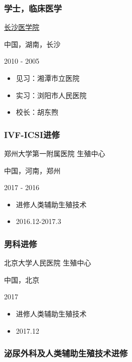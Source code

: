 \documentclass[]{article}
\providecommand{\tightlist}{%
  \setlength{\itemsep}{0pt}\setlength{\parskip}{0pt}}
\begin{document}
\hypertarget{ux5b66ux58ebux4e34ux5e8aux533bux5b66}{%
\subsubsection{学士，临床医学}\label{ux5b66ux58ebux4e34ux5e8aux533bux5b66}}

\href{http://www.csmu.edu.cn}{长沙医学院}

中国，湖南，长沙

2010 - 2005

\begin{itemize}
\tightlist
\item
  见习：湘潭市立医院
\item
  实习：浏阳市人民医院
\item
  校长：胡东煦
\end{itemize}

\hypertarget{ivf-icsiux8fdbux4fee}{%
\subsubsection{IVF-ICSI进修}\label{ivf-icsiux8fdbux4fee}}

郑州大学第一附属医院 生殖中心

中国，河南，郑州

2017 - 2016

\begin{itemize}
\tightlist
\item
  进修人类辅助生殖技术
\item
  2016.12-2017.3
\end{itemize}

\hypertarget{ux7537ux79d1ux8fdbux4fee}{%
\subsubsection{男科进修}\label{ux7537ux79d1ux8fdbux4fee}}

北京大学人民医院 生殖中心

中国，北京

2017

\begin{itemize}
\tightlist
\item
  进修人类辅助生殖技术
\item
  2017.12
\end{itemize}

\hypertarget{ux6cccux5c3fux5916ux79d1ux53caux4ebaux7c7bux8f85ux52a9ux751fux6b96ux6280ux672fux8fdbux4fee}{%
\subsubsection{泌尿外科及人类辅助生殖技术进修}\label{ux6cccux5c3fux5916ux79d1ux53caux4ebaux7c7bux8f85ux52a9ux751fux6b96ux6280ux672fux8fdbux4fee}}
\end{document}
